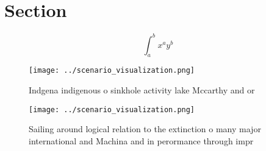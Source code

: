 \documentclass[a4paper]{article}
\begin{document}
\section{Section}

\[ \int_{a}^{b}{x^{a}y^{b}} \]

\begin{figure}
\centering
\texttt{[image: ../scenario\_visualization.png]}
\caption{Indgena indigenous o sinkhole activity lake Mccarthy and or
}
\end{figure}
 
\begin{figure}
\centering
\texttt{[image: ../scenario\_visualization.png]}
\caption{Sailing around logical relation to the extinction o many major international and Machina and in perormance through impr
}
\end{figure}
 
\end{document}
